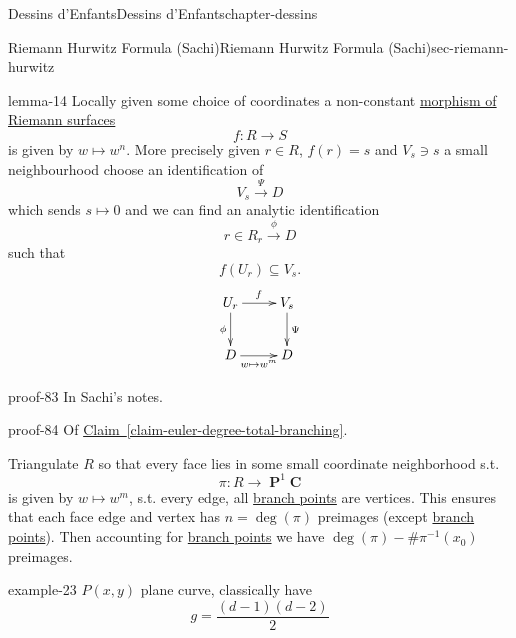 \documentclass[oneside,10pt,]{book}
\numberwithin{equation}{section}
\newcommand{\inv}{^{-1}}
\newcommand{\CC}{\mathbf{C}}
\DeclareMathOperator{\PP}{\mathbf{P}}
\begin{document}
\begin{chapterptx}{Dessins d'Enfants}{}{Dessins d'Enfants}{}{}{chapter-dessins}
\begin{sectionptx}{Riemann Hurwitz Formula (Sachi)}{}{Riemann Hurwitz Formula (Sachi)}{}{}{sec-riemann-hurwitz}
\begin{lemma}{}{}{lemma-14}%
\hypertarget{p-516}{}%
Locally given some choice of coordinates a non-constant \hyperref[def-morph-riem-surf]{morphism of Riemann surfaces}%
\begin{equation*}
f\colon R \to S
\end{equation*}
is given by \(w\mapsto w^n\). More precisely given \(r \in R\), \(f(r) = s\) and \(V_s \ni s\) a small neighbourhood choose an identification of%
\begin{equation*}
V_s \xrightarrow \Psi D
\end{equation*}
which sends \(s \mapsto 0\) and we can find an analytic identification%
\begin{equation*}
r\in R_r \xrightarrow \phi D
\end{equation*}
such that%
\begin{equation*}
f(U_r) \subseteq V_s\text{.}
\end{equation*}
%
\begin{equation*}
\xymatrix{U_r \ar[r]^f \ar[d]_\phi & V_s \ar[d]^\Psi \\ D \ar[r]_{w\mapsto w^m} & D}
\end{equation*}
%
\end{lemma}
\begin{proofptx}{}{proof-83}
\hypertarget{p-517}{}%
In Sachi's notes.%
\end{proofptx}
\begin{proofptx}{}{proof-84}
\hypertarget{p-518}{}%
Of \hyperref[claim-euler-degree-total-branching]{Claim~\ref{claim-euler-degree-total-branching}}.%
\par
\hypertarget{p-519}{}%
Triangulate \(R\) so that every face lies in some small coordinate neighborhood s.t.%
\begin{equation*}
\pi \colon R\to \PP^1 \CC
\end{equation*}
is given by \(w \mapsto w^m\), s.t. every edge, all \hyperref[def-branch-point]{branch points} are vertices. This ensures that each face edge and vertex has \(n  = \deg (\pi)\) preimages (except \hyperref[def-branch-point]{branch points}). Then accounting for \hyperref[def-branch-point]{branch points} we have \(\deg(\pi) -  \# \pi\inv (x_0)\) preimages.%
\end{proofptx}
\begin{example}{}{example-23}%
\hypertarget{p-520}{}%
\(P(x,y)\) plane curve, classically have%
\begin{equation*}
g = \frac{(d-1)(d-2)}{2}
\end{equation*}

\end{example}
\end{sectionptx}
\end{chapterptx}
\end{document}
